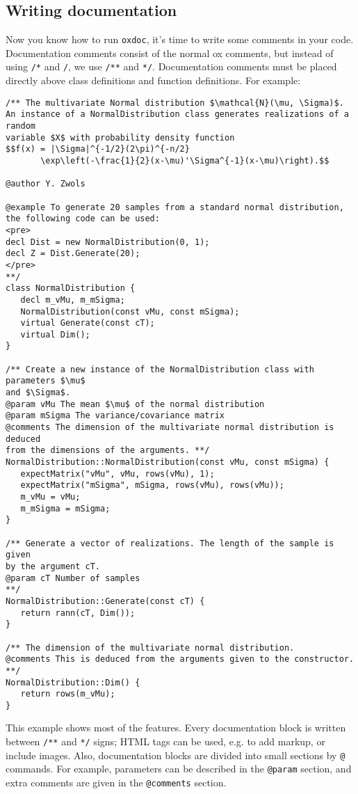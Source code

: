 \documentclass[11pt]{article}
\newcommand\oxdoc{{\tt oxdoc}}
\begin{document}
\subsection{Writing documentation}
Now you know how to run \oxdoc, it's time to write some comments
in your code. Documentation comments consist of the normal ox comments,
but instead of using {\tt /*} and {\tt */}, we use
{\tt /**} and {\tt **/}. Documentation comments must be placed 
directly above class definitions and function definitions. For example:

\begin{lstlisting}
/** The multivariate Normal distribution $\mathcal{N}(\mu, \Sigma)$.
An instance of a NormalDistribution class generates realizations of a random
variable $X$ with probability density function 
$$f(x) = |\Sigma|^{-1/2}(2\pi)^{-n/2}
       \exp\left(-\frac{1}{2}(x-\mu)'\Sigma^{-1}(x-\mu)\right).$$

@author Y. Zwols

@example To generate 20 samples from a standard normal distribution, 
the following code can be used:
<pre>
decl Dist = new NormalDistribution(0, 1);
decl Z = Dist.Generate(20);
</pre>
**/
class NormalDistribution {
   decl m_vMu, m_mSigma;
   NormalDistribution(const vMu, const mSigma);
   virtual Generate(const cT);
   virtual Dim();
}

/** Create a new instance of the NormalDistribution class with parameters $\mu$
and $\Sigma$.
@param vMu The mean $\mu$ of the normal distribution
@param mSigma The variance/covariance matrix
@comments The dimension of the multivariate normal distribution is deduced
from the dimensions of the arguments. **/
NormalDistribution::NormalDistribution(const vMu, const mSigma) {
   expectMatrix("vMu", vMu, rows(vMu), 1);
   expectMatrix("mSigma", mSigma, rows(vMu), rows(vMu));
   m_vMu = vMu;
   m_mSigma = mSigma;
}

/** Generate a vector of realizations. The length of the sample is given
by the argument cT.
@param cT Number of samples 
**/
NormalDistribution::Generate(const cT) {
   return rann(cT, Dim());
}

/** The dimension of the multivariate normal distribution.
@comments This is deduced from the arguments given to the constructor. **/
NormalDistribution::Dim() {
   return rows(m_vMu);
}
\end{lstlisting}

This example shows most of the features. Every documentation block is written
between {\tt /**} and {\tt **/} signs; HTML tags can be used, e.g. to add
markup, or include images. Also, documentation blocks are divided into small
sections by {\tt @} commands. For example, parameters can be described in the {\tt @param}
section, and extra comments are given in the {\tt @comments} section. 
\end{document}
